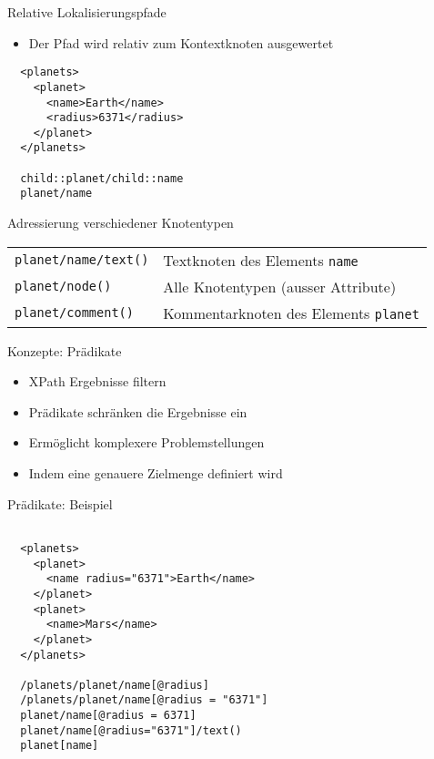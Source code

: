 \documentclass{beamer}
\begin{document}
\begin{frame}[fragile]{Relative Lokalisierungspfade}
	
	\begin{itemize}
		\item Der Pfad wird relativ zum Kontextknoten ausgewertet
	\end{itemize}
	
	\lstset{language=XML}
	\begin{lstlisting}	
  <planets>
    <planet>
      <name>Earth</name>
      <radius>6371</radius>
    </planet>
  </planets>

  child::planet/child::name
  planet/name
	\end{lstlisting}
	
\end{frame}

\begin{frame}[fragile]{Adressierung verschiedener Knotentypen}
	
	\centering
	\begin{tabular}{l|l}
		\texttt{planet/name/text()} & Textknoten des Elements \texttt{name} \\
		\texttt{planet/node()} & Alle Knotentypen (ausser Attribute) \\
		\texttt{planet/comment()} & Kommentarknoten des Elements \texttt{planet} \\
	\end{tabular}
	
\end{frame}

\begin{frame}[fragile]{Konzepte: Prädikate}
	
	\begin{itemize}
		\item XPath Ergebnisse filtern
		\item Prädikate schränken die Ergebnisse ein
		\item Ermöglicht komplexere Problemstellungen
		\item Indem eine genauere Zielmenge definiert wird
	\end{itemize}
	
\end{frame}

\begin{frame}[fragile]{Prädikate: Beispiel}
	
	\lstset{language=XML}
	\begin{lstlisting}
	
  <planets>
    <planet>
      <name radius="6371">Earth</name>
    </planet>
    <planet>
      <name>Mars</name>
    </planet>
  </planets>

  /planets/planet/name[@radius]
  /planets/planet/name[@radius = "6371"]
  planet/name[@radius = 6371]
  planet/name[@radius="6371"]/text()
  planet[name]
	\end{lstlisting}
	
\end{frame}
\end{document}
